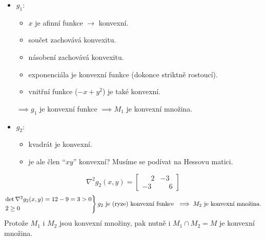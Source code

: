 \begin{itemize}
    \item $g_1$:
        \begin{itemize}
            \item $x$ je afinní funkce $\rightarrow$ konvexní.
            \item součet zachovává konvexitu.
            \item násobení zachovává konvexitu.
            \item exponenciála je konvexní funkce (dokonce striktně rostoucí).
            \item vnitřní funkce ($-x + y^2$) je také konvexní.
        \end{itemize}
        $\implies g_1$ je konvexní funkce $\implies M_1$ je konvexní množina.
    \item $g_2$:
        \begin{itemize}
            \item kvadrát je konvexní.
            \item je ale člen \enquote{$xy$} konvexní? Musíme se podívat na Hessovu matici.
        \end{itemize}
\end{itemize}
\[
    \nabla^2 g_2(x, y) =
    \begin{bmatrix}
        \phantom{-}2 & -3 \\
        -3 & \phantom{-}6
    \end{bmatrix}
\]
\[
    \begin{rcases*}
        \det \nabla^2 g_2(x, y) = 12 - 9 = 3 > 0 \\
        2 \geq 0
    \end{rcases*} g_2 \text{ je (ryze) konvexní funkce } \implies M_2 \text{ je konvexní množina.}
\]
Protože $M_1$ i $M_2$ jsou konvexní množiny, pak nutně i $M_1 \cap M_2 = M$ je konvexní množina.
